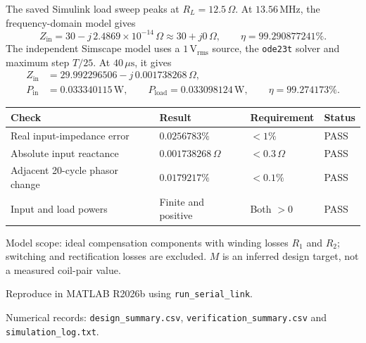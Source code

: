 \documentclass[11pt,a4paper]{article}
\newcommand{\step}[1]{\par\vspace{8pt}{\large\bfseries #1}\par\vspace{2pt}}
\newcommand{\ohm}{\,\Omega}
\begin{document}
\step{7. Simulation verification of the calculated design}
The saved Simulink load sweep peaks at $R_L=12.5\ohm$.
At $13.56\,\mathrm{MHz}$, the frequency-domain model gives
\[
 Z_{\mathrm{in}}=30-j\,2.4869\times10^{-14}\ohm\approx30+j0\ohm,
 \qquad \eta=99.290877241\%.
\]
The independent Simscape model uses a $1\,\mathrm{V_{rms}}$ source,
the \texttt{ode23t} solver and maximum step $T/25$.
At $40\,\mu\mathrm{s}$, it gives
\begin{align*}
 Z_{\mathrm{in}}&=29.992296506-j\,0.001738268\ohm,\\
 P_{\mathrm{in}}&=0.033340115\,\mathrm{W},\qquad
 P_{\mathrm{load}}=0.033098124\,\mathrm{W},\qquad
 \eta=99.274173\%.
\end{align*}
\begin{center}
\small
\begin{tabular}{@{}llll@{}}
\toprule
Check & Result & Requirement & Status \\
\midrule
Real input-impedance error & $0.0256783\%$ & $<1\%$ & PASS \\
Absolute input reactance & $0.001738268\ohm$ & $<0.3\ohm$ & PASS \\
Adjacent 20-cycle phasor change & $0.0179217\%$ & $<0.1\%$ & PASS \\
Input and load powers & Finite and positive & Both $>0$ & PASS \\
\bottomrule
\end{tabular}
\end{center}
{\small Model scope: ideal compensation components with winding losses
$R_1$ and $R_2$; switching and rectification losses are excluded.
$M$ is an inferred design target, not a measured coil-pair value.}

\vspace{3pt}
{\footnotesize Reproduce in MATLAB R2026b using \texttt{run\_serial\_link}.\par
Numerical records: \texttt{design\_summary.csv},
\texttt{verification\_summary.csv} and \texttt{simulation\_log.txt}.}
\end{document}
